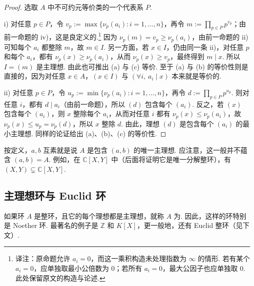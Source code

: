 \begin{proof}
选取 $A$ 中不可约元等价类的一个代表系 $P$.

i) 对任意 $p\in P$，令 $v_p:=\max\{\nu_p(a_i):i=1,\ldots,n\}$，再令 $m:=\prod_{p\in P}p^{v_p}$；由前一命题的 iv)，这是良定义的.\footnote{译注：原命题允许 $a_i=0$，而这一乘积构造未处理指数为 $\infty$ 的情形. 若有某个 $a_i=0$，应单独取最小公倍数为 $0$；若所有 $a_i=0$，最大公因子也应单独取 $0$. 此处保留原文的构造与论述.} 因为 $\nu_p(m)=v_p\geqslant\nu_p(a_i)$，由前一命题的 ii) 可知每个 $a_i$ 都整除 $m$，故 $m\in I$. 另一方面，若 $x\in I$，仍由同一条 ii)，对任意 $p$ 和每个 $a_i$，都有 $\nu_p(x)\geqslant\nu_p(a_i)$，从而 $\nu_p(x)\geqslant v_p$，最终得到 $m\mid x$. 所以 $I=(m)$ 是主理想. 由此也可推出 (a) 与 (c) 等价. 至于 (a) 与 (b) 的等价性则是直接的，因为对任意 $x\in A$，$(x\in I)$ 与 $(\forall i,\ a_i\mid x)$ 本来就是等价的.

ii) 对任意 $p\in P$，令 $u_p:=\min\{\nu_p(a_i):i=1,\ldots,n\}$，再令 $d:=\prod_{p\in P}p^{u_p}$. 则对任意 $i$，都有 $d\mid a_i$（由前一命题），所以 $(d)$ 包含每个 $(a_i)$. 反之，若 $(x)$ 包含每个 $(a_i)$，则 $x$ 整除每个 $a_i$，从而对任意 $i$ 都有 $\nu_p(x)\leqslant\nu_p(a_i)$，故 $\nu_p(x)\leqslant u_p=\nu_p(d)$，所以 $x$ 整除 $d$. 由此，理想 $(d)$ 是包含每个 $(a_i)$ 的最小主理想. 同样的论证给出 (a)、(b)、(c) 的等价性.
\end{proof}

\begin{remark*}[{注意}]
按定义，$a,b$ 互素就是说 $A$ 是包含 $(a,b)$ 的唯一主理想. 应注意，这一般并不蕴含 $(a,b)=A$. 例如，在 $\mathbb C[X,Y]$ 中（后面将证明它是唯一分解整环），有 $(X,Y)\subsetneq\mathbb C[X,Y]$.
\end{remark*}


\subsection{主理想环与 Euclid 环}\label{sec:galois-1-5-2}
如果环 $A$ 是整环，且它的每个理想都是主理想，就称 $A$ 为. 因此，这样的环特别是 Noether 环. 最著名的例子是 $\mathbb Z$ 和 $K[X]$，更一般地，还有 Euclid 整环（见下文）.

